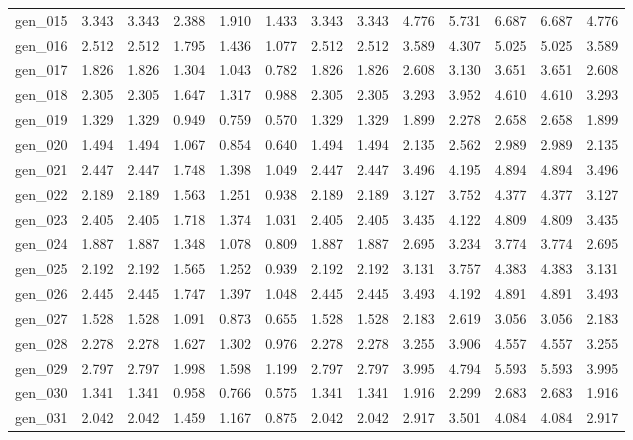 \begin{tabular}{lrrrrrrrrrrrr}
gen\_015 &  3.343 &  3.343 &  2.388 &  1.910 &  1.433 &  3.343 &  3.343 &  4.776 &  5.731 &  6.687 &  6.687 &  4.776 \\
gen\_016 &  2.512 &  2.512 &  1.795 &  1.436 &  1.077 &  2.512 &  2.512 &  3.589 &  4.307 &  5.025 &  5.025 &  3.589 \\
gen\_017 &  1.826 &  1.826 &  1.304 &  1.043 &  0.782 &  1.826 &  1.826 &  2.608 &  3.130 &  3.651 &  3.651 &  2.608 \\
gen\_018 &  2.305 &  2.305 &  1.647 &  1.317 &  0.988 &  2.305 &  2.305 &  3.293 &  3.952 &  4.610 &  4.610 &  3.293 \\
gen\_019 &  1.329 &  1.329 &  0.949 &  0.759 &  0.570 &  1.329 &  1.329 &  1.899 &  2.278 &  2.658 &  2.658 &  1.899 \\
gen\_020 &  1.494 &  1.494 &  1.067 &  0.854 &  0.640 &  1.494 &  1.494 &  2.135 &  2.562 &  2.989 &  2.989 &  2.135 \\
gen\_021 &  2.447 &  2.447 &  1.748 &  1.398 &  1.049 &  2.447 &  2.447 &  3.496 &  4.195 &  4.894 &  4.894 &  3.496 \\
gen\_022 &  2.189 &  2.189 &  1.563 &  1.251 &  0.938 &  2.189 &  2.189 &  3.127 &  3.752 &  4.377 &  4.377 &  3.127 \\
gen\_023 &  2.405 &  2.405 &  1.718 &  1.374 &  1.031 &  2.405 &  2.405 &  3.435 &  4.122 &  4.809 &  4.809 &  3.435 \\
gen\_024 &  1.887 &  1.887 &  1.348 &  1.078 &  0.809 &  1.887 &  1.887 &  2.695 &  3.234 &  3.774 &  3.774 &  2.695 \\
gen\_025 &  2.192 &  2.192 &  1.565 &  1.252 &  0.939 &  2.192 &  2.192 &  3.131 &  3.757 &  4.383 &  4.383 &  3.131 \\
gen\_026 &  2.445 &  2.445 &  1.747 &  1.397 &  1.048 &  2.445 &  2.445 &  3.493 &  4.192 &  4.891 &  4.891 &  3.493 \\
gen\_027 &  1.528 &  1.528 &  1.091 &  0.873 &  0.655 &  1.528 &  1.528 &  2.183 &  2.619 &  3.056 &  3.056 &  2.183 \\
gen\_028 &  2.278 &  2.278 &  1.627 &  1.302 &  0.976 &  2.278 &  2.278 &  3.255 &  3.906 &  4.557 &  4.557 &  3.255 \\
gen\_029 &  2.797 &  2.797 &  1.998 &  1.598 &  1.199 &  2.797 &  2.797 &  3.995 &  4.794 &  5.593 &  5.593 &  3.995 \\
gen\_030 &  1.341 &  1.341 &  0.958 &  0.766 &  0.575 &  1.341 &  1.341 &  1.916 &  2.299 &  2.683 &  2.683 &  1.916 \\
gen\_031 &  2.042 &  2.042 &  1.459 &  1.167 &  0.875 &  2.042 &  2.042 &  2.917 &  3.501 &  4.084 &  4.084 &  2.917 \\

\end{tabular}
